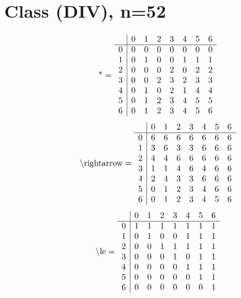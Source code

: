 \documentclass[11pt]{article}
\begin{document}
\section{Class (DIV), n=52}
\[\text{*} = 
\begin{array}{r | r r r r r r r}
 & 0 & 1 & 2 & 3 & 4 & 5 & 6 \\ \hline
0 & 0 & 0 & 0 & 0 & 0 & 0 & 0 \\
1 & 0 & 1 & 0 & 0 & 1 & 1 & 1 \\
2 & 0 & 0 & 0 & 2 & 0 & 2 & 2 \\
3 & 0 & 0 & 2 & 3 & 2 & 3 & 3 \\
4 & 0 & 1 & 0 & 2 & 1 & 4 & 4 \\
5 & 0 & 1 & 2 & 3 & 4 & 5 & 5 \\
6 & 0 & 1 & 2 & 3 & 4 & 5 & 6 \\
\end{array}
\]
\[\text{\textbackslash rightarrow} = 
\begin{array}{r | r r r r r r r}
 & 0 & 1 & 2 & 3 & 4 & 5 & 6 \\ \hline
0 & 6 & 6 & 6 & 6 & 6 & 6 & 6 \\
1 & 3 & 6 & 3 & 3 & 6 & 6 & 6 \\
2 & 4 & 4 & 6 & 6 & 6 & 6 & 6 \\
3 & 1 & 1 & 4 & 6 & 4 & 6 & 6 \\
4 & 2 & 4 & 3 & 3 & 6 & 6 & 6 \\
5 & 0 & 1 & 2 & 3 & 4 & 6 & 6 \\
6 & 0 & 1 & 2 & 3 & 4 & 5 & 6 \\
\end{array}
\]
\[\text{\textbackslash le} = 
\begin{array}{r | r r r r r r r}
 & 0 & 1 & 2 & 3 & 4 & 5 & 6 \\ \hline
0 & 1 & 1 & 1 & 1 & 1 & 1 & 1 \\
1 & 0 & 1 & 0 & 0 & 1 & 1 & 1 \\
2 & 0 & 0 & 1 & 1 & 1 & 1 & 1 \\
3 & 0 & 0 & 0 & 1 & 0 & 1 & 1 \\
4 & 0 & 0 & 0 & 0 & 1 & 1 & 1 \\
5 & 0 & 0 & 0 & 0 & 0 & 1 & 1 \\
6 & 0 & 0 & 0 & 0 & 0 & 0 & 1 \\
\end{array}
\]
\end{document}
